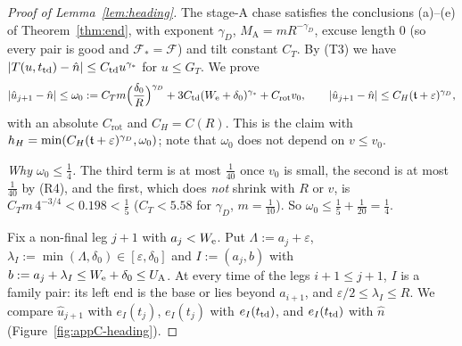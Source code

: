 \begin{proof}[Proof of Lemma~\ref{lem:heading}]
The stage-A chase satisfies the conclusions (a)--(e) of Theorem~\ref{thm:end}, with exponent $\gamma_D$,
$M_{\mathrm A}=mR^{-\gamma_D}$, excuse length $0$ (so every pair is good and $\mathcal F_*=\mathcal F$) and
tilt constant $C_T$. By (T3) we have $|T(u,t_{\mathrm{td}})-\hat n|\le C_{\mathrm{td}}u^{\gamma_*}$ for $u\le G_T$. We prove
\begin{equation}\label{eq:headclaim}
|\hat u_{j+1}-\hat n|\le\omega_0:=C_Tm\Bigl(\frac{\delta_0}R\Bigr)^{\gamma_D}+3C_{\mathrm{td}}(W_{\mathrm{e}}+\delta_0)^{\gamma_*}+C_{\mathrm{rot}}v_0,
\qquad |\hat u_{j+1}-\hat n|\le C_H(\mathfrak{t}+\varepsilon)^{\gamma_D},
\end{equation}
with an absolute $C_{\mathrm{rot}}$ and $C_H=C(R)$. This is the claim with $h_H=\min(C_H(\mathfrak{t}+\varepsilon)^{\gamma_D},\omega_0)$;
note that $\omega_0$ does not depend on $v\le v_0$.

\emph{Why $\omega_0\le\frac14$.} The third term is at most $\frac1{40}$ once $v_0$ is small, the second is at most
$\frac1{40}$ by (R4), and the first, which does \emph{not} shrink with $R$ or $v$, is $C_Tm\,4^{-3/4}<0.198<\frac15$
($C_T<5.58$ for $\gamma_D$, $m=\frac1{10}$). So $\omega_0\le\frac15+\frac1{20}=\frac14$.

Fix a non-final leg $j+1$ with $a_j<W_{\mathrm{e}}$. Put $\Lambda:=a_j+\varepsilon$, $\lambda_I:=\min(\Lambda,\delta_0)\in
[\varepsilon,\delta_0]$ and $I:=(a_j,b)$ with $b:=a_j+\lambda_I\le W_{\mathrm{e}}+\delta_0\le U_{\mathrm{A}}$. At every time of the legs
$i+1\le j+1$, $I$ is a family pair: its left end is the base or lies beyond $a_{i+1}$, and
$\varepsilon/2\le\lambda_I\le R$. We compare $\hat u_{j+1}$ with $e_I(t_j)$, $e_I(t_j)$ with $e_I(t_{\mathrm{td}})$, and
$e_I(t_{\mathrm{td}})$ with $\hat n$ (Figure~\ref{fig:appC-heading}).


\end{proof}
